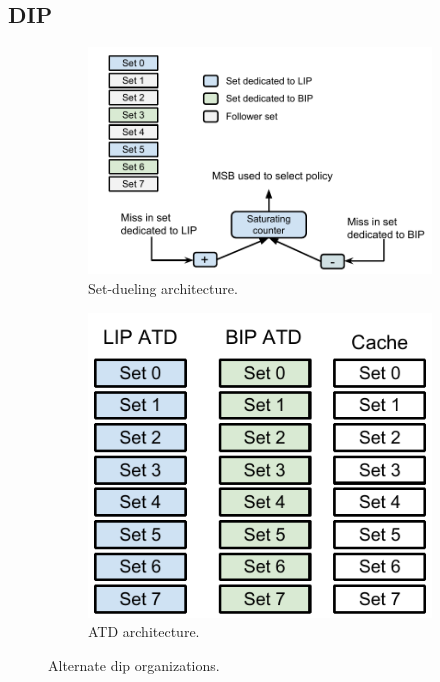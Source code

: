 \subsection{DIP}
\label{sec:algorithms:dip}

\begin{figure}
    \centering
    \begin{subfigure}[b]{0.50\textwidth}
        \includegraphics[width=\textwidth]{figures/algorithms/DIP_architecture}
        \caption{Set-dueling architecture.}
        \label{fig:algorithms:dip:set_dueling}
    \end{subfigure}    
    \begin{subfigure}[b]{0.45\textwidth}
        \includegraphics[width=.9\textwidth]{figures/algorithms/DIP_atd_architecture}
        \caption{ATD architecture.}
        \label{fig:algorithms:dip:atd}
    \end{subfigure}
    \caption{Alternate \gls{dip} organizations.}
\end{figure}

